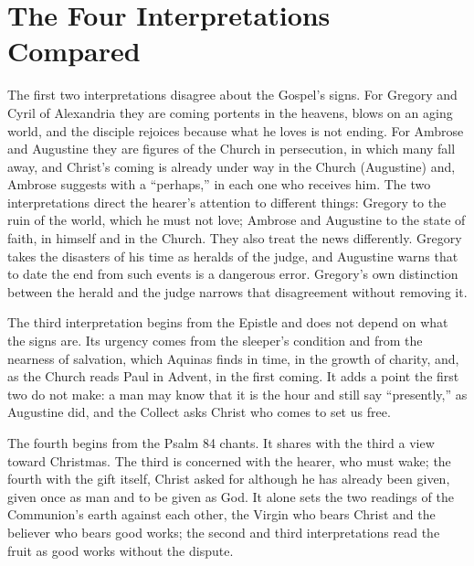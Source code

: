 \section{The Four Interpretations Compared}
\label{sec:comparison}

The first two interpretations disagree about the Gospel's signs. For Gregory
and Cyril of Alexandria they are coming portents in the heavens, blows on an
aging world, and the disciple rejoices because what he loves is not ending.
For Ambrose and Augustine they are figures of the Church in persecution, in
which many fall away, and Christ's coming is already under way in the Church
(Augustine) and, Ambrose suggests with a ``perhaps,'' in each one who
receives him. The two interpretations direct the hearer's attention to different
things: Gregory to the ruin of the world, which he must not love; Ambrose and
Augustine to the state of faith, in himself and in the Church. They also
treat the news differently. Gregory takes the disasters of his time as
heralds of the judge, and Augustine warns that to date the end from such
events is a dangerous error. Gregory's own distinction between the herald
and the judge narrows that disagreement without removing it.

The third interpretation begins from the Epistle and does not depend on what
the signs are. Its urgency comes from the sleeper's condition and from the
nearness of salvation, which Aquinas finds in time, in the growth of charity,
and, as the Church reads Paul in Advent, in the first coming. It adds a point
the first two do not make: a man may know that it is the hour and still say
``presently,'' as Augustine did, and the Collect asks Christ who comes to set
us free.

The fourth begins from the Psalm 84 chants. It shares with the third a view
toward Christmas. The third is concerned with the hearer, who must wake; the
fourth with the gift itself, Christ asked for although he has already been
given, given once as man and to be given as God. It alone sets the two
readings of the Communion's earth against each other, the Virgin who bears
Christ and the believer who bears good works; the second and third
interpretations read the fruit as good works without the dispute.

